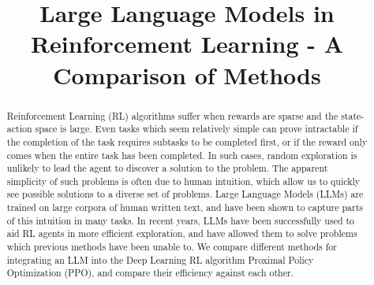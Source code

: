 \documentclass[conference]{IEEEtran}
\begin{document}
\title{Large Language Models in Reinforcement Learning - A Comparison of Methods}
\thispagestyle{plain}
\pagestyle{plain}

\author{
\and
{}
\and
{}
}

\maketitle

\begin{abstract}

Reinforcement Learning (RL) algorithms suffer when rewards are sparse and the state-action space is large. Even tasks which seem relatively simple can prove intractable if the completion of the task requires subtasks to be completed first, or if the reward only comes when the entire task has been completed. In such cases, random exploration is unlikely to lead the agent to discover a solution to the problem. The apparent simplicity of such problems is often due to human intuition, which allow us to quickly see possible solutions to a diverse set of problems. Large Language Models (LLMs) are trained on large corpora of human written text, and have been shown to capture parts of this intuition in many tasks. In recent years, LLMs have been successfully used to aid RL agents in more efficient exploration, and have allowed them to solve problems which previous methods have been unable to. We compare different methods for integrating an LLM into the Deep Learning RL algorithm Proximal Policy Optimization (PPO), and compare their efficiency against each other. 

\end{abstract}
\end{document}

